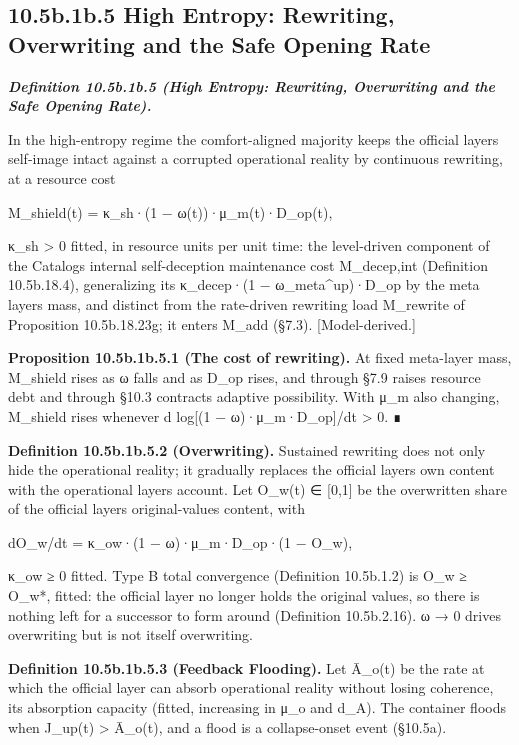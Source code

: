 \documentclass[
]{article}
\begin{document}
\hypertarget{b.1b.5-high-entropy-rewriting-overwriting-and-the-safe-opening-rate}{%
\subsection{10.5b.1b.5 High Entropy: Rewriting, Overwriting and the Safe
Opening
Rate}\label{b.1b.5-high-entropy-rewriting-overwriting-and-the-safe-opening-rate}}

\emph{\textbf{Definition 10.5b.1b.5 (High Entropy: Rewriting,
Overwriting and the Safe Opening Rate).}}

In the high-entropy regime the comfort-aligned majority keeps the
official layer\textquotesingle s self-image intact against a corrupted
operational reality by continuous rewriting, at a resource cost

M\_shield(t) = κ\_sh·(1 − ω(t))·μ\_m(t)·D\_op(t),

κ\_sh \textgreater{} 0 fitted, in resource units per unit time: the
level-driven component of the Catalog\textquotesingle s internal
self-deception maintenance cost M\_decep,int (Definition 10.5b.18.4),
generalizing its κ\_decep·(1 − ω\_meta\^{}up)·D\_op by the meta
layer\textquotesingle s mass, and distinct from the rate-driven
rewriting load M\_rewrite of Proposition 10.5b.18.23g; it enters M\_add
(§7.3). {[}Model-derived.{]}

\textbf{Proposition 10.5b.1b.5.1 (The cost of rewriting).} At fixed
meta-layer mass, M\_shield rises as ω falls and as D\_op rises, and
through §7.9 raises resource debt and through §10.3 contracts adaptive
possibility. With μ\_m also changing, M\_shield rises whenever d
log{[}(1 − ω)·μ\_m·D\_op{]}/dt \textgreater{} 0. ∎

\textbf{Definition 10.5b.1b.5.2 (Overwriting).} Sustained rewriting does
not only hide the operational reality; it gradually replaces the
official layer\textquotesingle s own content with the operational
layer\textquotesingle s account. Let O\_w(t) ∈ {[}0,1{]} be the
overwritten share of the official layer\textquotesingle s
original-values content, with

dO\_w/dt = κ\_ow·(1 − ω)·μ\_m·D\_op·(1 − O\_w),

κ\_ow ≥ 0 fitted. Type B total convergence (Definition 10.5b.1.2) is
O\_w ≥ O\_w*, fitted: the official layer no longer holds the original
values, so there is nothing left for a successor to form around
(Definition 10.5b.2.16). ω → 0 drives overwriting but is not itself
overwriting.

\textbf{Definition 10.5b.1b.5.3 (Feedback Flooding).} Let Ā\_o(t) be the
rate at which the official layer can absorb operational reality without
losing coherence, its absorption capacity (fitted, increasing in μ\_o
and d\_A). The container floods when J\_up(t) \textgreater{} Ā\_o(t),
and a flood is a collapse-onset event (§10.5a).
\end{document}
